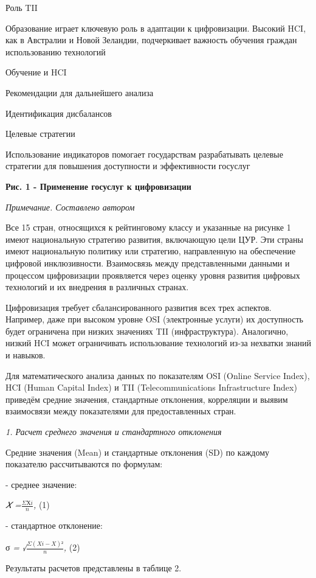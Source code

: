 {Роль TII

Образование играет ключевую роль в адаптации к цифровизации. Высокий
HCI, как в Австралии и Новой Зеландии, подчеркивает важность обучения
граждан использованию технологий

Обучение и HCI

Рекомендации для дальнейшего анализа

Идентификация дисбалансов

Целевые стратегии

Использование индикаторов помогает государствам разрабатывать целевые
стратегии для повышения доступности и эффективности госуслуг

{\bfseries Рис. 1 - Применение госуслуг к цифровизации}

\emph{Примечание. Составлено автором}

Все 15 стран, относящихся к рейтинговому классу и указанные на рисунке 1
имеют национальную стратегию развития, включающую цели ЦУР. Эти страны
имеют национальную политику или стратегию, направленную на обеспечение
цифровой инклюзивности. Взаимосвязь между представленными данными и
процессом цифровизации проявляется через оценку уровня развития цифровых
технологий и их внедрения в различных странах.

Цифровизация требует сбалансированного развития всех трех аспектов.
Например, даже при высоком уровне OSI (электронные услуги) их
доступность будет ограничена при низких значениях TII (инфраструктура).
Аналогично, низкий HCI может ограничивать использование технологий из-за
нехватки знаний и навыков.

Для математического анализа данных по показателям OSI (Online Service
Index), HCI (Human Capital Index) и TII (Telecommunications
Infrastructure Index) приведём средние значения, стандартные отклонения,
корреляции и выявим взаимосвязи между показателями для предоставленных
стран.

\emph{1. Расчет среднего значения и стандартного отклонения}

Средние значения (Mean) и стандартные отклонения (SD) по каждому
показателю рассчитываются по формулам:

- среднее значение:

\emph{𝑋 =}\(\frac{\Sigma Хi}{n}\)\emph{,} (1)

- стандартное отклонение:

σ \emph{= √}\(\frac{\Sigma(Xi - X)²}{n}\)\emph{,} (2)

Результаты расчетов представлены в таблице 2.

}
